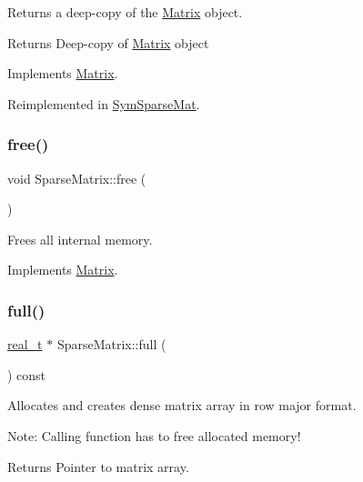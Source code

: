 Returns a deep-\/copy of the \hyperlink{class_matrix}{Matrix} object. \begin{DoxyReturn}{Returns}
Deep-\/copy of \hyperlink{class_matrix}{Matrix} object 
\end{DoxyReturn}


Implements \hyperlink{class_matrix_abf41d80f7392e9d63e9b2fa4b822d3b9}{Matrix}.



Reimplemented in \hyperlink{class_sym_sparse_mat_a3538621d1eadb47a97e7299cf87c0e66}{Sym\+Sparse\+Mat}.

\mbox{\label{class_sparse_matrix_a79d5aeb24f1b1184b9fb798144999ea2}} 
\subsubsection{\texorpdfstring{free()}{free()}}
{\footnotesize\ttfamily void Sparse\+Matrix\+::free (\begin{DoxyParamCaption}{ }\end{DoxyParamCaption})\hspace{0.3cm}{\ttfamily [virtual]}}

Frees all internal memory. 

Implements \hyperlink{class_matrix_ae13ca77389c2eae7b3eba79cb9fefecb}{Matrix}.

\mbox{\label{class_sparse_matrix_a9ade370eadd43330336498cde4c3b3a7}} 
\subsubsection{\texorpdfstring{full()}{full()}}
{\footnotesize\ttfamily \hyperlink{qp_o_a_s_e_s__wrapper_8h_a0d00e2b3dfadee81331bbb39068570c4}{real\+\_\+t} $\ast$ Sparse\+Matrix\+::full (\begin{DoxyParamCaption}{ }\end{DoxyParamCaption}) const\hspace{0.3cm}{\ttfamily [virtual]}}

Allocates and creates dense matrix array in row major format.

Note\+: Calling function has to free allocated memory!

\begin{DoxyReturn}{Returns}
Pointer to matrix array. 
\end{DoxyReturn}


